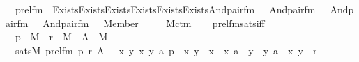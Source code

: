 \begin{isabellebody}
\ \ {\isachardoublequoteopen}prel{\isacharunderscore}{\kern0pt}fm\ {\isasymequiv}\ Exists{\isacharparenleft}{\kern0pt}Exists{\isacharparenleft}{\kern0pt}Exists{\isacharparenleft}{\kern0pt}Exists{\isacharparenleft}{\kern0pt}Exists{\isacharparenleft}{\kern0pt}Exists{\isacharparenleft}{\kern0pt}And{\isacharparenleft}{\kern0pt}pair{\isacharunderscore}{\kern0pt}fm{\isacharparenleft}{\kern0pt}{}{\isacharcomma}{\kern0pt}\ {}{\isacharcomma}{\kern0pt}\ {}{\isacharparenright}{\kern0pt}{\isacharcomma}{\kern0pt}\ And{\isacharparenleft}{\kern0pt}pair{\isacharunderscore}{\kern0pt}fm{\isacharparenleft}{\kern0pt}{}{\isacharcomma}{\kern0pt}\ {}{\isacharcomma}{\kern0pt}\ {}{\isacharparenright}{\kern0pt}{\isacharcomma}{\kern0pt}\ And{\isacharparenleft}{\kern0pt}pair{\isacharunderscore}{\kern0pt}fm{\isacharparenleft}{\kern0pt}{}{\isacharcomma}{\kern0pt}\ {}{\isacharcomma}{\kern0pt}\ {}{\isacharparenright}{\kern0pt}{\isacharcomma}{\kern0pt}\ And{\isacharparenleft}{\kern0pt}pair{\isacharunderscore}{\kern0pt}fm{\isacharparenleft}{\kern0pt}{}{\isacharcomma}{\kern0pt}\ {}{\isacharcomma}{\kern0pt}\ {}{\isacharparenright}{\kern0pt}{\isacharcomma}{\kern0pt}\ Member{\isacharparenleft}{\kern0pt}{}{\isacharcomma}{\kern0pt}\ {}{\isacharparenright}{\kern0pt}{\isacharparenright}{\kern0pt}{\isacharparenright}{\kern0pt}{\isacharparenright}{\kern0pt}{\isacharparenright}{\kern0pt}{\isacharparenright}{\kern0pt}{\isacharparenright}{\kern0pt}{\isacharparenright}{\kern0pt}{\isacharparenright}{\kern0pt}{\isacharparenright}{\kern0pt}{\isacharparenright}{\kern0pt}\ \ {\isachardoublequoteclose}\ \isanewline
\isanewline
{}\isamarkupfalse%
\ M{\isacharunderscore}{\kern0pt}ctm\ \isanewline
{}\ \isanewline
\isanewline
{}\isamarkupfalse%
\ prel{\isacharunderscore}{\kern0pt}fm{\isacharunderscore}{\kern0pt}sats{\isacharunderscore}{\kern0pt}iff\ {\isacharcolon}{\kern0pt}\ \isanewline
\ \ {\isachardoublequoteopen}p\ {\isasymin}\ M\ {\isasymLongrightarrow}\ r\ {\isasymin}\ M\ {\isasymLongrightarrow}\ A\ {\isasymin}\ M\ {\isasymLongrightarrow}\ \isanewline
\ \ sats{\isacharparenleft}{\kern0pt}M{\isacharcomma}{\kern0pt}\ prel{\isacharunderscore}{\kern0pt}fm{\isacharcomma}{\kern0pt}\ {\isacharbrackleft}{\kern0pt}p{\isacharcomma}{\kern0pt}\ r{\isacharcomma}{\kern0pt}\ A{\isacharbrackright}{\kern0pt}{\isacharparenright}{\kern0pt}\ {\isasymlongleftrightarrow}\ {\isacharparenleft}{\kern0pt}{\isasymexists}\ x\ y\ x{\isacharprime}{\kern0pt}\ y{\isacharprime}{\kern0pt}\ a{\isachardot}{\kern0pt}\ p\ {\isacharequal}{\kern0pt}\ {\isacharless}{\kern0pt}x{\isacharcomma}{\kern0pt}\ y{\isachargreater}{\kern0pt}\ {\isasymand}\ x\ {\isacharequal}{\kern0pt}\ {\isacharless}{\kern0pt}x{\isacharprime}{\kern0pt}{\isacharcomma}{\kern0pt}\ a{\isachargreater}{\kern0pt}\ {\isasymand}\ y\ {\isacharequal}{\kern0pt}\ {\isacharless}{\kern0pt}y{\isacharprime}{\kern0pt}{\isacharcomma}{\kern0pt}\ a{\isachargreater}{\kern0pt}\ {\isasymand}\ {\isacharless}{\kern0pt}x{\isacharprime}{\kern0pt}{\isacharcomma}{\kern0pt}\ y{\isacharprime}{\kern0pt}{\isachargreater}{\kern0pt}\ {\isasymin}\ r{\isacharparenright}{\kern0pt}{\isachardoublequoteclose}\ \isanewline

\end{isabellebody}
